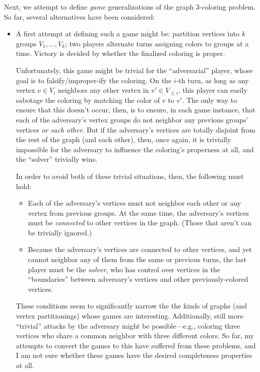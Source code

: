 Next, we attempt to define \emph{game} generalizations of the graph
\(3\)-coloring problem.  So far, several alternatives have been considered:
\begin{itemize}

  \item A first attempt at defining such a game might be: partition vertices
    into \(k\) groups \(V_1,\dotsc,V_k\); two players alternate turns assigning
    colors to groups at a time.  Victory is decided by whether the finalized
    coloring is proper.

    Unfortunately, this game might be trivial for the ``adversarial'' player,
    whose goal is to falsify/improper-ify the coloring.  On the \(i\)-th turn,
    as long as any vertex \(v∈V_i\) neighbors any other vertex in
    \(v'∈V_{≤i}\), this player can easily sabotage the coloring by matching the
    color of \(v\) to \(v'\).  The only way to ensure that this doesn't occur,
    then, is to ensure, in each game instance, that each of the adversary's
    vertex groups do not neighbor any previous groups' vertices \emph{or each
    other}. But if the adversary's vertices are totally disjoint from the rest
    of the graph (and each other), then, once again, it is trivially impossible
    for the adversary to influence the coloring's properness at all, and the
    ``solver'' trivially wins.

    In order to avoid both of these trivial situations, then, the following
    must hold:
    \begin{itemize}[nosep]
      \item Each of the adversary's vertices must not neighbor each other or
        any vertex from previous groups.  At the same time, the adversary's
        vertices must be \emph{connected} to other vertices in the graph.
        (Those that aren't can be trivially ignored.)
      \item Because the adversary's vertices are connected to other vertices,
        and yet cannot neighbor any of them from the same or previous turns,
        the last player must be the \emph{solver}, who has control over
        vertices in the ``boundaries'' between adversary's vertices and other
        previously-colored vertices.
    \end{itemize}
    These conditions seem to significantly narrow the the kinds of graphs (and
    vertex partitionings) whose games are interesting.  Additionally, still
    more ``trivial'' attacks by the adversary might be possible---e.g.,
    coloring three vertices who share a common neighbor with three different
    colors.  So far, my attempts to convert the \CSAT{} games to this have
    suffered from these problems, and I am not sure whether these games have
    the desired completeness properties at all.


\end{itemize}
